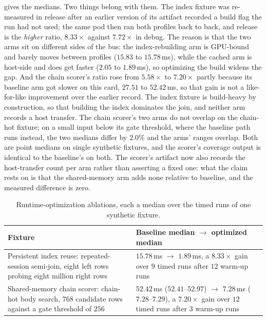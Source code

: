  gives the medians. Two things belong with them. The index fixture was re-measured in release after an earlier version of its artifact recorded a build flag the run had not used; the same pod then ran both profiles back to back, and release is the \emph{higher} ratio, $8.33\times$ against $7.72\times$ in debug. The reason is that the two arms sit on different sides of the bus: the index-rebuilding arm is GPU-bound and barely moves between profiles ($15.83$ to $15.78$\,ms), while the cached arm is host-side and does get faster ($2.05$ to $1.89$\,ms), so optimizing the build widens the gap. And the chain scorer's ratio rose from $5.58\times$ to $7.20\times$ partly because its baseline arm got slower on this card, $27.51$ to $52.42$\,ms, so that gain is not a like-for-like improvement over the earlier record. The index fixture is build-heavy by construction, so that building the index dominates the join, and neither arm records a host transfer. The chain scorer's two arms do not overlap on the chain-hot fixture; on a small input below its gate threshold, where the baseline path runs instead, the two medians differ by $2.0\%$ and the arms' ranges overlap. Both are point medians on single synthetic fixtures, and the scorer's coverage output is identical to the baseline's on both. The scorer's artifact now also records the host-transfer count per arm rather than asserting a fixed one: what the claim rests on is that the shared-memory arm adds none relative to baseline, and the measured difference is zero.

\begin{table}[htbp]
  \centering
  \caption{Runtime-optimization ablations, each a median over the timed runs of one synthetic fixture.}
  \label{tab:runtime-opt}
  \small
  \begin{tabularx}{\linewidth}{@{}L L@{}}
    \toprule
    \textbf{Fixture} & \textbf{Baseline median $\to$ optimized median} \\
    \midrule
    Persistent index reuse: repeated-session semi-join, eight left rows probing eight million right rows
      & $15.78$\,ms $\to$ $1.89$\,ms, a $8.33\times$ gain over $9$ timed runs after $12$ warm-up runs \\
    \addlinespace
    Shared-memory chain scorer: chain-hot body search, $768$ candidate rows against a gate threshold of $256$
      & $52.42$\,ms ($52.41$--$52.97$) $\to$ $7.28$\,ms ($7.28$--$7.29$), a $7.20\times$ gain over $12$ timed runs after $3$ warm-up runs \\
    \bottomrule
  \end{tabularx}
\end{table}


